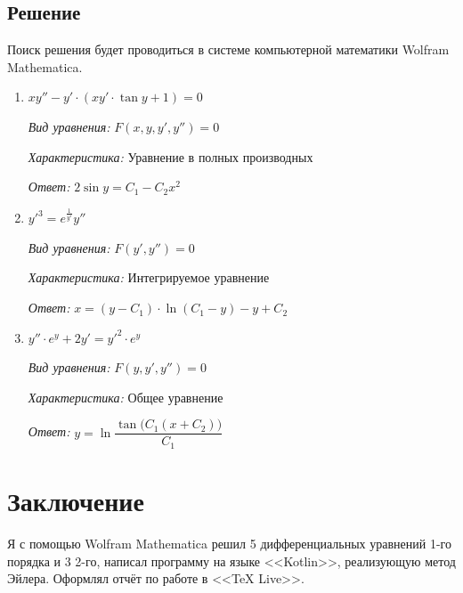 \documentclass[a4paper, 14pt, fleqn]{extarticle}
\begin{document}
		\subsection{Решение}
			\noindent Поиск решения будет проводиться в системе компьютерной математики Wolfram Mathematica.
			\begin{enumerate}
				\item \(  xy'' - y' \cdot (xy' \cdot \tan{y} + 1) = 0 \)

					\textit{Вид уравнения:} \( F(x, y, y', y'') = 0 \)

					\textit{Характеристика:} Уравнение в полных производных
		
					\textit{Ответ:} \( 2\sin{y} = C_1 - C_2x^2 \)

				\item \( y'^3 = e^{\frac{1}{y'}}y'' \)
					
					\textit{Вид уравнения:} \( F(y', y'') = 0 \)

					\textit{Характеристика:} Интегрируемое уравнение
		
					\textit{Ответ:} \(x =  (y - C_1) \cdot \ln{( C_1 - y )}  - y + C_2\)

				\item \( y'' \cdot e^y + 2y' = y'^2 \cdot e^y \)
				
					\textit{Вид уравнения:} \( F(y, y', y'') = 0 \)

					\textit{Характеристика:} Общее уравнение
		
					\textit{Ответ:} \( y = \ln{\dfrac{\tan{\big(C_1(x+C_2)\big)}}{C_1}} \)
			\end{enumerate}

	\section{Заключение}
		\noindent Я с помощью Wolfram Mathematica решил 5 дифференциальных уравнений 1-го порядка и 3 2-го, написал программу на языке <<Kotlin>>, реализующую метод Эйлера. Оформлял отчёт по работе  в <<TeX Live>>.
\end{document}
